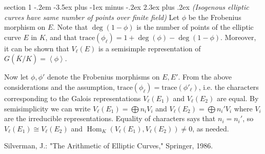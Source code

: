 \documentclass[12pt]{article}
\makeatletter
\theoremstyle{norm}
\newcommand{\an}[1]{\left\langle {#1}\right\rangle}
\newcommand{\Hom}{\operatorname{Hom}}
\newcommand{\tr}[0]{\text{trace}}
\newcommand{\ol}[1]{\overline{#1}}
\newenvironment{problem}{\@startsection
       {section}
       {1}
       {-.2em}
       {-3.5ex plus -1ex minus -.2ex}
       {2.3ex plus .2ex}
       {\pagebreak[3]%
       \large\bf\noindent{Problem }
       }
       }
       {%
       }
\makeatother
\begin{document}
\begin{problem}{\it (Isogenous elliptic curves have same number of points over finite field)}
Let $\phi$ be the Frobenius morphism on $E$.
Note that $\deg(1-\phi)$ is the number of points of the elliptic curve $E$ in $K$, and that $\tr(\phi_{\ell})=1+\deg(\phi)-\deg(1-\phi)$. Moreover, it can be shown that $V_{\ell}(E)$ is a semisimple representation of $G(\ol{K}/K)=\an{\phi}$.

Now let $\phi,\phi'$ denote the Frobenius morphisms on $E,E'$. From the above considerations and the assumption, $\tr(\phi_{\ell})=\tr(\phi'_{\ell})$, i.e. the characters corresponding to the Galois representations $V_{\ell}(E_1)$ and $V_{\ell}(E_2)$ are equal.
By semisimplicity we can write $V_{\ell}(E_1)=\bigoplus n_iV_i$ and $V_{\ell}(E_2)=\bigoplus n_i'V_i$ where $V_i$ are the irreducible representations. Equality of characters says that $n_i=n_i'$, so $V_{\ell}(E_1)\cong V_{\ell}(E_2)$ and $\Hom_K(V_{\ell}(E_1),V_{\ell}(E_2))\neq 0$, as needed.
\end{problem}
\begin{thebibliography}{9}
 Silverman, J.: "The Arithmetic of Elliptic Curves," Springer, 1986.
\end{thebibliography}
\end{document}
